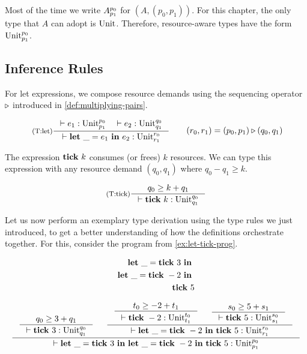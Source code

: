 Most of the time we write \(A ^{p_0}_{p_1}\) for \((A, (p_0, p_1))\). For this chapter, the only type that \(A\) can adopt is \(\text{Unit}\). Therefore, resource-aware types have the form \(\text{Unit} ^{p_0}_{p_1}\).

\subsection{Inference Rules}

For let expressions, we compose resource demands using the sequencing operator \(\triangleright\) introduced in \cref{def:multiplying-pairs}. 

\[
   \label{def:tr-let-4}
   \vcenter{\hbox{
      \inference[(T:let)]
      {\typing{}{e_1}{\ratype{\unit}{p_0}{p_1}} \quad \typing{}{e_2}{\ratype{\unit}{q_0}{q_1}}}
      {\typing{}{\letexp{\_}{e_1}{e_2}}{\ratype{\unit}{r_0}{r_1}}}
}}\qquad \begin{aligned}
      (r_0, r_1) = (p_0, p_1) \sequence (q_0, q_1)
   \end{aligned}
\]

The expression \(\mathbf{tick}~k\) consumes (or frees) \(k\) resources. We can type this expression with any resource demand \((q_0, q_1)\) where \(q_0 - q_1 \geq k\).

\[
   \label{def:tr-tick-4}
   \inference[(T:tick)]
   {q_0 \geq k + q_1}
   {\typing{}{\tick{k}}{\ratype{\unit}{q_0}{q_1}}}
\]


Let us now perform an exemplary type derivation using the type rules we just introduced, to get a better understanding of how the definitions orchestrate together. For this, consider the program from \cref{ex:let-tick-prog}.

\begin{align*}\label{eqn:let-tick-derivation}
\letexp{\_}{\tick{3}}{} \\
\letexp{\_}{\tick{-2}}{} \\
\tick{5}
\end{align*}


\[
   \inference
   {
      \inference
      {q_0 \geq 3 + q_1}
      {\typing{}{\tick{3}}{\ratype{\unit}{q_0}{q_1}}}
       &
      \inference
      {
         \inference
         {t_0 \geq -2 + t_1}
         {\typing{}{\tick{-2}}{\ratype{\unit}{t_0}{t_1}}}
          &
         \inference
         {s_0 \geq 5 + s_1}
         {\typing{}{\tick{5}}{\ratype{\unit}{s_0}{s_1}}}
      }
      {\typing{}{\letexp{\_}{\tick{-2}}{\tick{5}}}{\ratype{\unit}{r_0}{r_1}}}
   }
   {\typing{}{\letexp{\_}{\tick{3}}{\letexp{\_}{\tick{-2}}{\tick{5}}}}{\ratype{\unit}{p_0}{p_1}}}
\]

